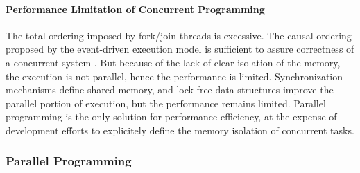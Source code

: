 \paragraph{Performance Limitation of Concurrent Programming}




The total ordering imposed by fork/join threads is excessive.
The causal ordering proposed by the event-driven execution model is sufficient to assure correctness of a concurrent system \cite{Lamport1978,Reed2012}.
But because of the lack of clear isolation of the memory, the execution is not parallel, hence the performance is limited.
Synchronization mechanisms define shared memory, and lock-free data structures improve the parallel portion of execution, but the performance remains limited.
Parallel programming is the only solution for performance efficiency, at the expense of development efforts to explicitely define the memory isolation of concurrent tasks.









\subsubsection{Parallel Programming} \label{chapter3:software-performance:parallel-programming}


